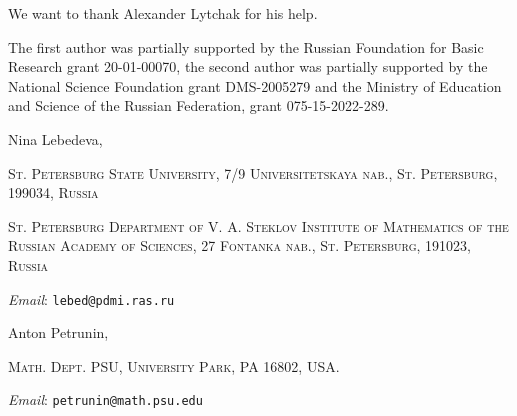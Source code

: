 \documentclass{article}
\makeatletter
\newcommand{\Addresses}{{\bigskip\footnotesize

\noindent Nina Lebedeva,
\par\nopagebreak
 \textsc{St. Petersburg State University, 7/9 Universitetskaya nab., St. Petersburg, 199034, Russia}
\par
\nopagebreak
 \textsc{St. Petersburg Department of V. A. Steklov Institute of Mathematics of the Russian Academy of Sciences, 27 Fontanka nab., St. Petersburg, 191023, Russia}
  \par\nopagebreak
  \textit{Email}: \texttt{lebed@pdmi.ras.ru}

\medskip

\noindent   Anton Petrunin, 
\par\nopagebreak
 \textsc{Math. Dept. PSU, University Park, PA 16802, USA.}
  \par\nopagebreak
  \textit{Email}: \texttt{petrunin@math.psu.edu}
  
}}
\makeatother
\begin{document}
We want to thank Alexander Lytchak for his help. 

The first author was partially supported by the Russian Foundation for Basic Research grant 20-01-00070, the second author was partially supported by the National Science Foundation grant DMS-2005279
and the Ministry of Education and Science of the Russian Federation, grant 075-15-2022-289.

{\sloppy
\printbibliography[heading=bibintoc]
\fussy
}

\Addresses
\end{document}

